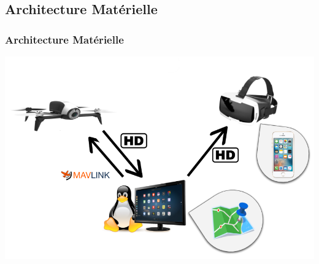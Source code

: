 \documentclass{beamer}
\begin{document}





	\begin{frame}
		\section{Architecture Matérielle}
		\begin{center}
		\frametitle{Architecture Matérielle}

       
        \includegraphics[scale=0.6]{archi_materielle.png}
		\end{center}
	\end{frame}
	
\end{document}
